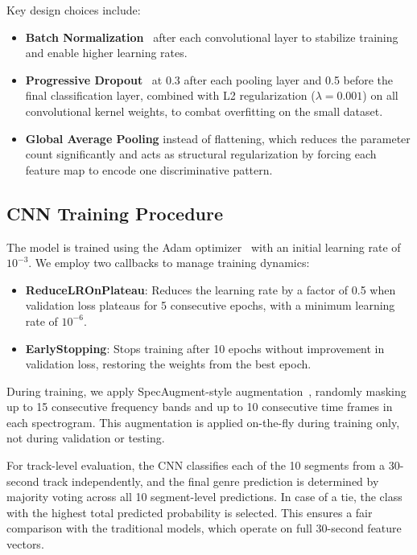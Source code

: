 \documentclass[10pt,journal]{IEEEtran}
\begin{document}
Key design choices include:
\begin{itemize}
    \item \textbf{Batch Normalization}~\cite{ioffe2015batch} after each convolutional layer to stabilize training and enable higher learning rates.
    \item \textbf{Progressive Dropout}~\cite{srivastava2014dropout} at 0.3 after each pooling layer and 0.5 before the final classification layer, combined with L2 regularization ($\lambda = 0.001$) on all convolutional kernel weights, to combat overfitting on the small dataset.
    \item \textbf{Global Average Pooling} instead of flattening, which reduces the parameter count significantly and acts as structural regularization by forcing each feature map to encode one discriminative pattern.
\end{itemize}

\subsection{CNN Training Procedure}

The model is trained using the Adam optimizer~\cite{kingma2014adam} with an initial learning rate of $10^{-3}$. We employ two callbacks to manage training dynamics:
\begin{itemize}
    \item \textbf{ReduceLROnPlateau}: Reduces the learning rate by a factor of 0.5 when validation loss plateaus for 5 consecutive epochs, with a minimum learning rate of $10^{-6}$.
    \item \textbf{EarlyStopping}: Stops training after 10 epochs without improvement in validation loss, restoring the weights from the best epoch.
\end{itemize}

During training, we apply SpecAugment-style augmentation~\cite{park2019specaugment}, randomly masking up to 15 consecutive frequency bands and up to 10 consecutive time frames in each spectrogram. This augmentation is applied on-the-fly during training only, not during validation or testing.

For track-level evaluation, the CNN classifies each of the 10 segments from a 30-second track independently, and the final genre prediction is determined by majority voting across all 10 segment-level predictions. In case of a tie, the class with the highest total predicted probability is selected. This ensures a fair comparison with the traditional models, which operate on full 30-second feature vectors.
\end{document}
